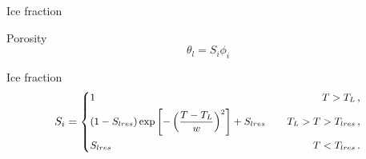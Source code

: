 \documentclass{beamer}
\begin{document}
\begin{frame}{Ice fraction}
\begin{block}{Porosity}
\begin{equation*}
\theta_l =S_i \phi_i
\end{equation*} 
\end{block}
{
\begin{block}{Ice fraction}
\begin{equation*}
\small
S_i=\left\{
\begin{aligned}
&1 \quad & T > T_L \,,\\
&(1-S_{lres})\exp\left[ - \left( \frac{T-T_L}{w}\right)^2 \right] +
S_{lres} \quad & T_L> T > T_{lres}\,,\\
&S_{lres}  \quad &  T < T_{lres}\,.
\end{aligned}
\right.
\end{equation*}
\end{block}
}
\end{frame}
\end{document}

